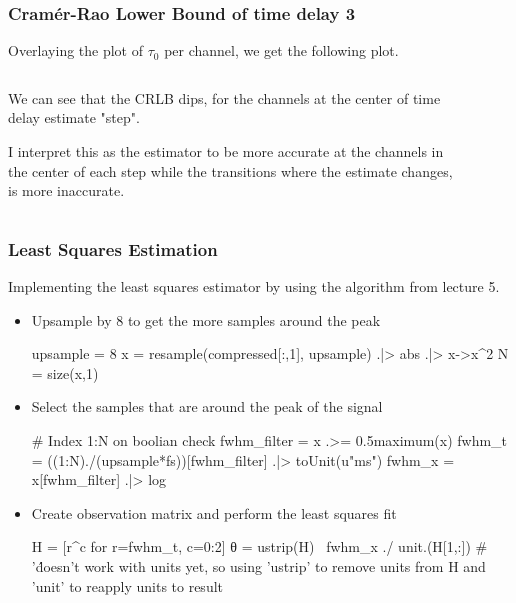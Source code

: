 \documentclass[compress]{beamer}
\begin{document}
\begin{frame} %
    \frametitle{Cramér-Rao Lower Bound of time delay 3}
    Overlaying the plot of $\tau_0$ per channel, we get the following plot.
    \begin{columns}
        \begin{column}{0.5\textwidth}
            We can see that the CRLB dips, for the channels at the center of
            time delay estimate "step". 

            I interpret this as the estimator to be
            more accurate at the channels in the center of each step while the
            transitions where the estimate changes, is more inaccurate. 
        \end{column}
        \begin{column}{0.5\textwidth}
            \begin{figure}
                
            \end{figure}
        \end{column}
    \end{columns}
\end{frame} %

\begin{frame}[fragile] %
    \frametitle{Least Squares Estimation}
    Implementing the least squares estimator by using the algorithm from lecture 5.
    \begin{itemize}
        \item Upsample by 8 to get the more samples around the peak
            \begin{jllisting}[gobble=16]
                upsample = 8
                x = resample(compressed[:,1], upsample) .|> abs .|> x->x^2
                N = size(x,1)
            \end{jllisting}
        \item Select the samples that are around the peak of the signal
            \begin{jllisting}[gobble=16]
                # Index 1:N on boolian check
                fwhm_filter = x .>= 0.5maximum(x)
                fwhm_t = ((1:N)./(upsample*fs))[fwhm_filter] .|> toUnit(u"ms")
                fwhm_x = x[fwhm_filter] .|> log
            \end{jllisting}

        \item Create observation matrix and perform the least squares fit
            \begin{jllisting}[gobble=16]
                H = [r^c for r=fwhm_t, c=0:2]
                θ = ustrip(H) \ fwhm_x ./ unit.(H[1,:])
                # '\' doesn't work with units yet, so using 'ustrip' to remove units from H and 'unit' to reapply units to result
            \end{jllisting}
    \end{itemize}
\end{frame}
\end{document}

